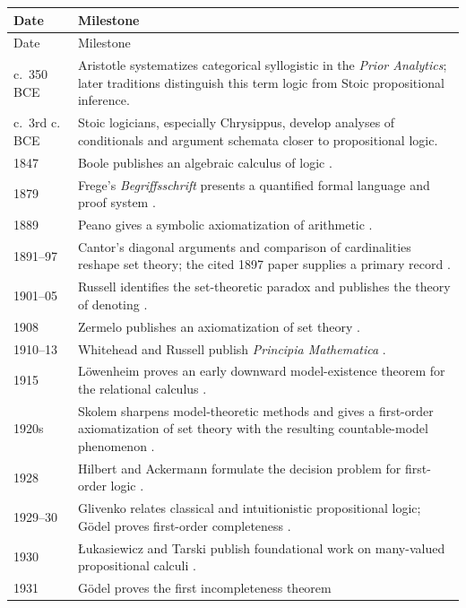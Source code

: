 \begin{longtable}{@{}p{}p{}@{}}
\toprule
Date & Milestone \\
\midrule
\endfirsthead
\toprule
Date & Milestone \\
\midrule
\endhead
c.~350 BCE & Aristotle systematizes categorical syllogistic in the
\emph{Prior Analytics}; later traditions distinguish this term logic from
Stoic propositional inference. \\
c.~3rd c. BCE & Stoic logicians, especially Chrysippus, develop analyses of
conditionals and argument schemata closer to propositional logic. \\
1847 & Boole publishes an algebraic calculus of logic \cite{Boole1847}. \\
1879 & Frege's \emph{Begriffsschrift} presents a quantified formal language and
proof system \cite{Frege1879}. \\
1889 & Peano gives a symbolic axiomatization of arithmetic \cite{Peano1889}. \\
1891--97 & Cantor's diagonal arguments and comparison of cardinalities reshape
set theory; the cited 1897 paper supplies a primary record \cite{Cantor1897}. \\
1901--05 & Russell identifies the set-theoretic paradox and publishes the
theory of denoting \cite{Russell1905}. \\
1908 & Zermelo publishes an axiomatization of set theory \cite{Zermelo1908}. \\
1910--13 & Whitehead and Russell publish \emph{Principia Mathematica}
\cite{WhiteheadRussell1910}. \\
1915 & L\"owenheim proves an early downward model-existence theorem for the
relational calculus \cite{Lowenheim1915}. \\
1920s & Skolem sharpens model-theoretic methods and gives a first-order
axiomatization of set theory with the resulting countable-model phenomenon
\cite{Skolem1923}. \\
1928 & Hilbert and Ackermann formulate the decision problem for first-order
logic \cite{HilbertAckermann1928}. \\
1929--30 & Glivenko relates classical and intuitionistic propositional logic;
G\"odel proves first-order completeness \cite{Glivenko1929,Godel1930}. \\
1930 & \L{}ukasiewicz and Tarski publish foundational work on many-valued
propositional calculi \cite{LukasiewiczTarski1930}. \\
1931 & G\"odel proves the first incompleteness theorem

\end{longtable}
